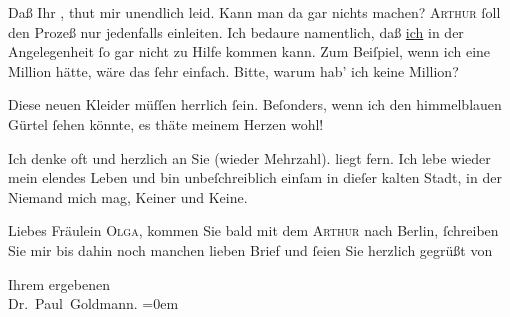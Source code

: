 \pstart
           {\pb}Daß Ihr \label{K_L03086-7v}\label{K_L03086-7}, thut mir unendlich leid. Kann man da gar nichts machen? \textsc{Arthur} ſoll den Prozeß nur jedenfalls einleiten. Ich bedaure namentlich, daß
                  \uline{ich} in der Angelegenheit ſo gar nicht zu Hilfe
               kommen kann. Zum Beiſpiel, wenn ich eine Million hätte, wäre das ſehr einfach. Bitte,
               warum hab’ ich keine Million?\pend
           
\pstart
           Diese neuen Kleider müſſen herrlich ſein. Beſonders, wenn ich den himmelblauen
               Gürtel ſehen könnte, es thäte meinem Herzen wohl!\pend
           
\pstart
           Ich denke oft und herzlich an Sie (wieder Mehrzahl). \label{K_L03086-8v}\label{K_L03086-8} liegt fern. Ich lebe wieder mein elendes Leben und bin unbeſchreiblich einſam
               in dieſer kalten Stadt, in der
               Niemand mich mag, Keiner und Keine.\pend
           
\pstart
           {\pb}Liebes Fräulein \textsc{Olga},
               kommen Sie bald mit dem \textsc{Arthur} nach Berlin, ſchreiben Sie mir bis dahin noch manchen lieben Brief
               und ſeien Sie herzlich gegrüßt von\pend
           
\pstart
            Ihrem ergebenen{\\[\baselineskip]}\spacefill\mbox{Dr. Paul Goldmann.}\pend
           \leftskip=0em{}\endnumbering{}  
      
